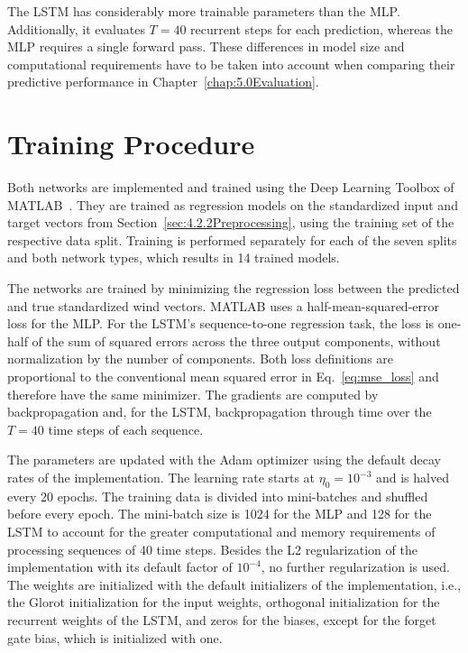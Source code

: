 The LSTM has considerably more trainable parameters than the MLP. Additionally, it evaluates $T = 40$ recurrent steps for each prediction, whereas the MLP requires a single forward pass. These differences in model size and computational requirements have to be taken into account when comparing their predictive performance in Chapter~\ref{chap:5.0Evaluation}.





\section{Training Procedure}
\label{sec:4.4TrainingProcedure}

Both networks are implemented and trained using the Deep Learning Toolbox of MATLAB~\cite{MathworksDeepLearning}. They are trained as regression models on the standardized input and target vectors from Section~\ref{sec:4.2.2Preprocessing}, using the training set of the respective data split. Training is performed separately for each of the seven splits and both network types, which results in 14 trained models.

The networks are trained by minimizing the regression loss between the predicted and true standardized wind vectors. MATLAB uses a half-mean-squared-error loss for the MLP. For the LSTM's sequence-to-one regression task, the loss is one-half of the sum of squared errors across the three output components, without normalization by the number of components. Both loss definitions are proportional to the conventional mean squared error in Eq.~\eqref{eq:mse_loss} and therefore have the same minimizer. The gradients are computed by backpropagation and, for the LSTM, backpropagation through time over the $T=40$ time steps of each sequence.

The parameters are updated with the Adam optimizer \cite{Kingma2014Adam} using the default decay rates of the implementation. The learning rate starts at $\eta_0 = 10^{-3}$ and is halved every 20 epochs. The training data is divided into mini-batches and shuffled before every epoch. The mini-batch size is 1024 for the MLP and 128 for the LSTM to account for the greater computational and memory requirements of processing sequences of 40 time steps.
Besides the L2 regularization of the implementation with its default factor of $10^{-4}$, no further regularization is used. The weights are initialized with the default initializers of the implementation, i.e., the Glorot initialization for the input weights, orthogonal initialization for the recurrent weights of the LSTM, and zeros for the biases, except for the forget gate bias, which is initialized with one.

